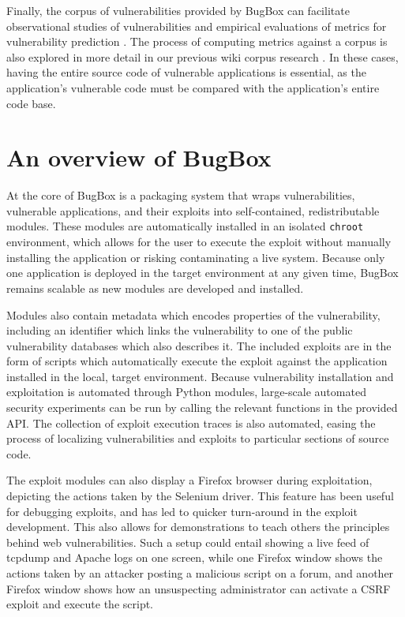 \documentclass[letterpaper,twocolumn,10pt]{article}
\begin{document}
Finally, the corpus of vulnerabilities provided by BugBox can facilitate observational studies of vulnerabilities \cite{empiricalinvestigation} and empirical evaluations of metrics for vulnerability prediction \cite{evalcomplexityvul,metrisec2012surface}. The process of computing metrics against a corpus is also explored in more detail in our previous wiki corpus research \cite{stuckman2011analyzing}. In these cases, having the entire source code of vulnerable applications is essential, as the application's vulnerable code must be compared with the application's entire code base.

\section{An overview of BugBox}

At the core of BugBox is a packaging system that wraps vulnerabilities, vulnerable applications, and their exploits into self-contained, redistributable modules. These modules are automatically installed in an isolated \texttt{chroot} environment, which allows for the user to execute the exploit without manually installing the application or risking contaminating a live system. Because only one application is deployed in the target environment at any given time, BugBox remains scalable as new modules are developed and installed.

Modules also contain metadata which encodes properties of the vulnerability, including an identifier which links the vulnerability to one of the public vulnerability databases which also describes it. The included exploits are in the form of scripts which automatically execute the exploit against the application installed in the local, target environment. Because vulnerability installation and exploitation is automated through Python modules, large-scale automated security experiments can be run by calling the relevant functions in the provided API. The collection of exploit execution traces is also automated, easing the process of localizing vulnerabilities and exploits to particular sections of source code.

The exploit modules can also display a Firefox browser during exploitation, depicting the actions taken by the Selenium driver. This feature has been useful for debugging exploits, and has led to quicker turn-around in the exploit development. This also allows for demonstrations to teach others the principles behind web vulnerabilities.  Such a setup could entail showing a live feed of tcpdump and Apache logs on one screen, while one Firefox window shows the actions taken by an attacker posting a malicious script on a forum, and another Firefox window shows how an unsuspecting administrator can activate a CSRF exploit and execute the script. 
\end{document}
